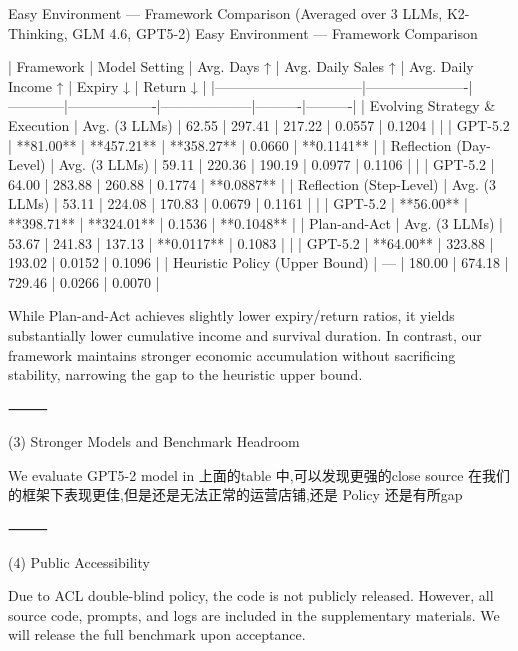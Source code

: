 Easy Environment — Framework Comparison (Averaged over 3 LLMs, K2-Thinking, GLM 4.6, GPT5-2)
Easy Environment — Framework Comparison

| Framework                     | Model Setting        | Avg. Days ↑ | Avg. Daily Sales ↑ | Avg. Daily Income ↑ | Expiry ↓ | Return ↓ |
|--------------------------------|----------------------|------------|-------------------|--------------------|----------|----------|
| Evolving Strategy & Execution  | Avg. (3 LLMs)        | 62.55      | 297.41            | 217.22             | 0.0557   | 0.1204   |
|                                | GPT-5.2              | **81.00**  | **457.21**        | **358.27**         | 0.0660   | **0.1141** |
| Reflection (Day-Level)         | Avg. (3 LLMs)        | 59.11      | 220.36            | 190.19             | 0.0977   | 0.1106   |
|                                | GPT-5.2              | 64.00      | 283.88            | 260.88             | 0.1774   | **0.0887** |
| Reflection (Step-Level)        | Avg. (3 LLMs)        | 53.11      | 224.08            | 170.83             | 0.0679   | 0.1161   |
|                                | GPT-5.2              | **56.00**  | **398.71**        | **324.01**         | 0.1536   | **0.1048** |
| Plan-and-Act                   | Avg. (3 LLMs)        | 53.67      | 241.83            | 137.13             | **0.0117** | 0.1083   |
|                                | GPT-5.2              | **64.00**  | 323.88            | 193.02             | 0.0152   | 0.1096   |
| Heuristic Policy (Upper Bound) | —                    | 180.00     | 674.18            | 729.46             | 0.0266   | 0.0070   |

While Plan-and-Act achieves slightly lower expiry/return ratios, it yields substantially lower cumulative income and survival duration. In contrast, our framework maintains stronger economic accumulation without sacrificing stability, narrowing the gap to the heuristic upper bound.

⸻

(3) Stronger Models and Benchmark Headroom

We evaluate GPT5-2 model in 上面的table 中,可以发现更强的close source 在我们的框架下表现更佳,但是还是无法正常的运营店铺,还是 Policy 还是有所gap


⸻

(4) Public Accessibility

Due to ACL double-blind policy, the code is not publicly released. However, all source code, prompts, and logs are included in the supplementary materials. We will release the full benchmark upon acceptance.

